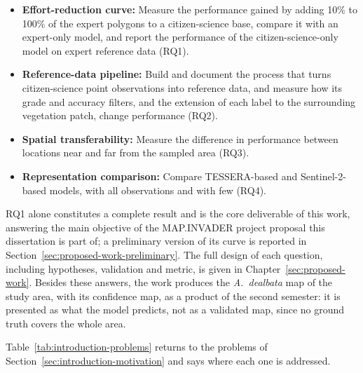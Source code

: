 \begin{itemize}
  \item \textbf{Effort-reduction curve:} Measure the performance
  gained by adding 10\% to 100\% of the expert polygons to a
  citizen-science base, compare it with an expert-only model, and
  report the performance of the citizen-science-only model on expert
  reference data (RQ1).
  \item \textbf{Reference-data pipeline:} Build and document the
  process that turns citizen-science point observations into
  reference data, and measure how its grade and accuracy filters, and
  the extension of each label to the surrounding vegetation patch,
  change performance (RQ2).
  \item \textbf{Spatial transferability:} Measure the difference in
  performance between locations near and far from the sampled area
  (RQ3).
  \item \textbf{Representation comparison:} Compare TESSERA-based and
  Sentinel-2-based models, with all observations and with few (RQ4).
\end{itemize}

RQ1 alone constitutes a complete result and is the core deliverable
of this work, answering the main objective of the MAP.INVADER project
proposal this dissertation is part of; a preliminary version of its
curve is reported in Section~\ref{sec:proposed-work-preliminary}. The
full design of each question, including hypotheses, validation and
metric, is given in Chapter~\ref{sec:proposed-work}. Besides these
answers, the work produces the \emph{A.~dealbata} map of the study
area, with its confidence map, as a product of the second semester:
it is presented as what the model predicts, not as a validated map,
since no ground truth covers the whole area.

Table~\ref{tab:introduction-problems} returns to the problems of
Section~\ref{sec:introduction-motivation} and says where each one is
addressed.

